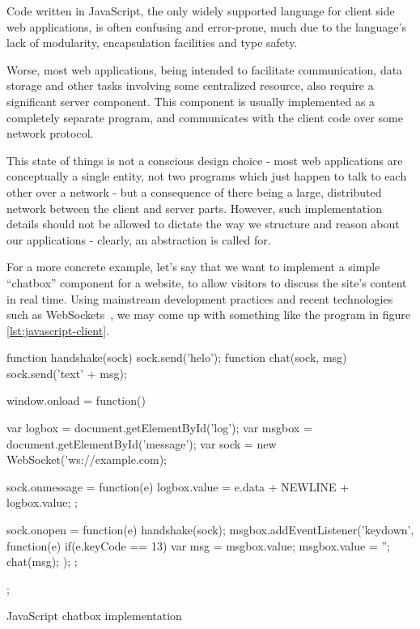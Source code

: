 \documentclass[preprint]{sigplanconf}
\begin{document}
Code written in JavaScript, the only widely supported language for client side
web applications, is often confusing and error-prone, much due to the
language's lack of modularity, encapsulation facilities and type safety.

Worse, most web applications, being intended to facilitate communication, data
storage and other tasks involving some centralized resource, also require a
significant server component. This component is usually implemented as a
completely separate program, and communicates with the client code over some
network protocol.

This state of things is not a conscious design choice - most web applications
are conceptually a single entity, not two programs which just happen to talk
to each other over a network - but a consequence of there being a large,
distributed network between the client and server parts.
However, such implementation details should not be allowed to dictate the way
we structure and reason about our applications - clearly, an abstraction is
called for.

For a more concrete example, let's say that we want to implement a simple
``chatbox'' component for a website, to allow visitors to discuss the site's
content in real time. Using mainstream development practices and recent
technologies such as WebSockets\ \cite{websockets}, we may come up with
something like the program in figure \ref{lst:javascript-client}.

\label{sec:jsexample}
\begin{listingfloat}
\begin{code}
function handshake(sock) {sock.send('helo');}
function chat(sock, msg) {sock.send('text' + msg);}

window.onload = function() {
  var logbox = document.getElementById('log');
  var msgbox = document.getElementById('message');
  var sock = new WebSocket('ws://example.com);

  sock.onmessage = function(e) {
    logbox.value = e.data + NEWLINE + logbox.value;
  };

  sock.onopen = function(e) {
    handshake(sock);
    msgbox.addEventListener('keydown', function(e) {
      if(e.keyCode == 13) {
        var msg = msgbox.value;
        msgbox.value = '';
        chat(msg);
      }
    });
  };
};
\end{code}
\caption{JavaScript chatbox implementation}
\label{lst:javascript-client}
\end{listingfloat}
\end{document}
